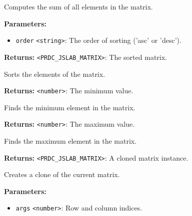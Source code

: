 \documentclass[12pt,a4paper]{article}
\begin{document}
\noindent Computes the sum of all elements in the matrix.

\vspace{5mm}
\noindent {}


\noindent \textbf{Parameters:}
\begin{itemize}
  \item \texttt{order} \texttt{<string>}: The order of sorting ('asc' or 'desc').
\end{itemize}

\noindent \textbf{Returns:} \texttt{<PRDC\_JSLAB\_MATRIX>}: The sorted matrix.

\noindent Sorts the elements of the matrix.

\vspace{5mm}
\noindent {}


\noindent \textbf{Returns:} \texttt{<number>}: The minimum value.

\noindent Finds the minimum element in the matrix.

\vspace{5mm}
\noindent {}


\noindent \textbf{Returns:} \texttt{<number>}: The maximum value.

\noindent Finds the maximum element in the matrix.

\vspace{5mm}
\noindent {}


\noindent \textbf{Returns:} \texttt{<PRDC\_JSLAB\_MATRIX>}: A cloned matrix instance.

\noindent Creates a clone of the current matrix.

\vspace{5mm}
\noindent {}


\noindent \textbf{Parameters:}
\begin{itemize}
  \item \texttt{args} \texttt{<number>}: Row and column indices.
\end{itemize}
\end{document}
